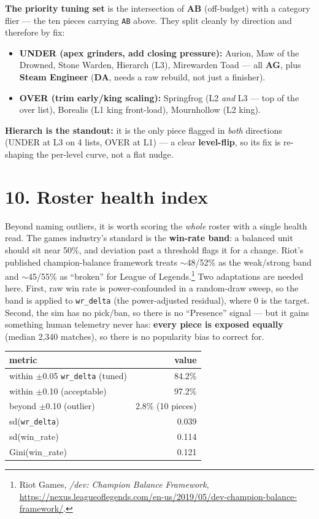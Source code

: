 \documentclass[10pt]{article}
\begin{document}
\textbf{The priority tuning set} is the intersection of \textbf{AB} (off-budget) with a category flier --- the ten pieces carrying \texttt{AB} above. They split cleanly by direction and therefore by fix:\\
\begin{itemize}
\item \textbf{UNDER (apex grinders, add closing pressure):} Aurion, Maw of the Drowned, Stone Warden, Hierarch (L3), Mirewarden Toad --- all \textbf{AG}, plus \textbf{Steam Engineer} (\textbf{DA}, needs a raw rebuild, not just a finisher).
\item \textbf{OVER (trim early/king scaling):} Springfrog (L2 \emph{and} L3 --- top of the over list), Borealis (L1 king front-load), Mournhollow (L2 king).
\end{itemize}
\textbf{Hierarch is the standout:} it is the only piece flagged in \emph{both} directions (UNDER at L3 on 4 lists, OVER at L1) --- a clear \textbf{level-flip}, so its fix is re-shaping the per-level curve, not a flat nudge.\\

\section*{10. Roster health index}

Beyond naming outliers, it is worth scoring the \emph{whole} roster with a single health read. The games industry's standard is the \textbf{win-rate band}: a balanced unit should sit near 50\%, and deviation past a threshold flags it for a change. Riot's published champion-balance framework treats $\sim$48/52\% as the weak/strong band and $\sim$45/55\% as ``broken'' for League of Legends.\footnote{Riot Games, \emph{/dev: Champion Balance Framework}, \url{https://nexus.leagueoflegends.com/en-us/2019/05/dev-champion-balance-framework/}.} Two adaptations are needed here. First, raw win rate is power-confounded in a random-draw sweep, so the band is applied to \texttt{wr\_\allowbreak{}delta} (the power-adjusted residual), where 0 is the target. Second, the sim has no pick/ban, so there is no ``Presence'' signal --- but it gains something human telemetry never has: \textbf{every piece is exposed equally} (median 2{,}340 matches), so there is no popularity bias to correct for.\\

\medskip
\begin{tabularx}{\linewidth}{Lr}
\toprule
\textbf{metric} & \textbf{value} \\
\midrule
within $\pm$0.05 \texttt{wr\_\allowbreak{}delta} (tuned) & 84.2\% \\
within $\pm$0.10 (acceptable) & 97.2\% \\
beyond $\pm$0.10 (outlier) & 2.8\% (10 pieces) \\
sd(\texttt{wr\_\allowbreak{}delta}) & 0.039 \\
sd(win\_rate) & 0.114 \\
Gini(win\_rate) & 0.121 \\
\bottomrule
\end{tabularx}
\medskip
\end{document}

